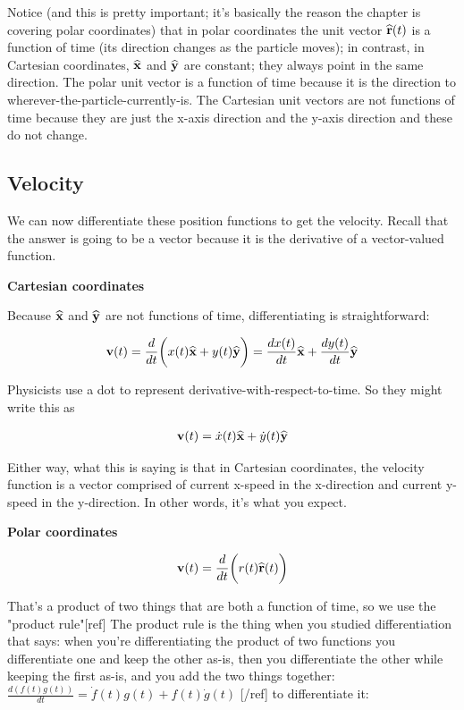 Notice (and this is pretty important; it's basically the reason the chapter is
covering polar coordinates) that in polar coordinates the unit vector
$\mathbf{\widehat{r}}(t)$ is a function of time (its direction changes as the particle moves);
in contrast, in Cartesian coordinates, $\mathbf{\widehat{x}}$ and $\mathbf{\widehat{y}}$ are constant; they
always point in the same direction. The polar unit vector is a function of time
because it is the direction to wherever-the-particle-currently-is. The
Cartesian unit vectors are not functions of time because they are just the
x-axis direction and the y-axis direction and these do not change.

\subsection{Velocity}


We can now differentiate these position functions to get the velocity. Recall
that the answer is going to be a vector because it is the derivative of a
vector-valued function.

\textbf{Cartesian coordinates}

Because $\mathbf{\widehat{x}}$ and $\mathbf{\widehat{y}}$ are not functions of time, differentiating is
straightforward:

\begin{align*}
\mathbf v(t) = \frac{d}{dt}\bigg(x(t)\mathbf{\widehat{x}} + y(t)\mathbf{\widehat{y}}\bigg) = \frac{d x(t)}{dt}\mathbf{\widehat{x}} + \frac{d y(t)}{dt} \mathbf{\widehat{y}}
\end{align*}

Physicists use a dot to represent derivative-with-respect-to-time. So they
might write this as

\begin{align*}
\mathbf v(t) =  \dot x(t) \mathbf{\widehat{x}} + \dot y(t) \mathbf{\widehat{y}}
\end{align*}

Either way, what this is saying is that in Cartesian coordinates, the velocity
function is a vector comprised of current x-speed in the x-direction and
current y-speed in the y-direction. In other words, it's what you expect.

\textbf{Polar coordinates}

\begin{align*}
\mathbf v(t) = \frac{d}{dt}\bigg(r(t)\mathbf{\widehat{r}}(t)\bigg)
\end{align*}

That's a product of two things that are both a function of time, so we use the
"product rule"[ref] The product rule is the thing when you studied
differentiation that says: when you're differentiating the product of two
functions you differentiate one and keep the other as-is, then you
differentiate the other while keeping the first as-is, and you add the two
things together: $\frac{d(f(t)g(t))}{dt} = \dot f(t) g(t) + f(t) \dot g(t)$
[/ref] to differentiate it:

